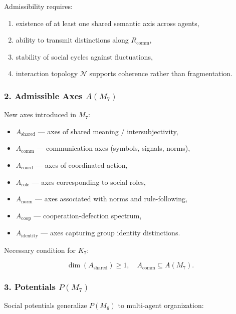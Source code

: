 Admissibility requires:

\begin{enumerate}
    \item existence of at least one shared semantic axis across agents,
    \item ability to transmit distinctions along $R_{\mathrm{comm}}$,
    \item stability of social cycles against fluctuations,
    \item interaction topology $\mathcal{N}$ supports coherence rather than fragmentation.
\end{enumerate}

\subsubsection*{2. Admissible Axes \texorpdfstring{$A(M_7)$}{A(M_7)}}

New axes introduced in $M_7$:

\begin{itemize}
    \item $A_{\mathrm{shared}}$ — axes of shared meaning / intersubjectivity,
    \item $A_{\mathrm{comm}}$ — communication axes (symbols, signals, norms),
    \item $A_{\mathrm{coord}}$ — axes of coordinated action,
    \item $A_{\mathrm{role}}$ — axes corresponding to social roles,
    \item $A_{\mathrm{norm}}$ — axes associated with norms and rule-following,
    \item $A_{\mathrm{coop}}$ — cooperation-defection spectrum,
    \item $A_{\mathrm{identity}}$ — axes capturing group identity distinctions.
\end{itemize}

Necessary condition for $K_7$:

\[
\dim(A_{\mathrm{shared}})\ge 1,\quad
A_{\mathrm{comm}}\subseteq A(M_7).
\]

\subsubsection*{3. Potentials \texorpdfstring{$P(M_7)$}{P(M_7)}}

Social potentials generalize $P(M_6)$ to multi-agent organization:

